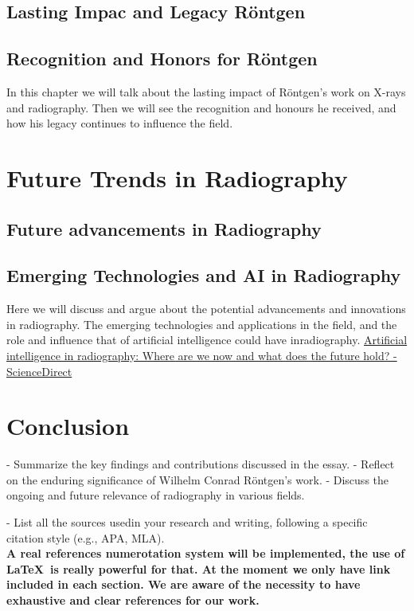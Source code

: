 \documentclass[a4paper,12pt]{report}
\begin{document}
\section{Lasting Impac and Legacy Röntgen}
\section{Recognition and Honors for Röntgen}
In this chapter we will talk about the lasting impact of Röntgen's work on X-rays and radiography. Then we will see the recognition and honours he received, and how his legacy continues to influence the field.

\chapter{Future Trends in Radiography}
\section{Future advancements in Radiography}
\section{Emerging Technologies and AI in Radiography}
Here we will discuss and argue about the potential advancements and innovations in radiography. The emerging technologies and applications in the field, and the role and influence that of artificial intelligence could have inradiography.
\href{https://www.sciencedirect.com/science/article/abs/pii/S107881742100095X}{Artificial intelligence in radiography: Where are we now and what does the future hold? - ScienceDirect }
\chapter{Conclusion}

- Summarize the key findings and contributions discussed in the essay.
- Reflect on the enduring significance of Wilhelm Conrad Röntgen's work.
- Discuss the ongoing and future relevance of radiography in various fields.



\printbibheading
- List all the sources usedin your research and writing, following a specific citation style (e.g., APA, MLA).\\[1ex]

\textbf{A real references numerotation system will be implemented, the use of  \LaTeX\ is really powerful for that. At the moment we only have link included in each section. We are aware of the necessity to have exhaustive and clear references for our work. }\\[1ex]
\end{document}
